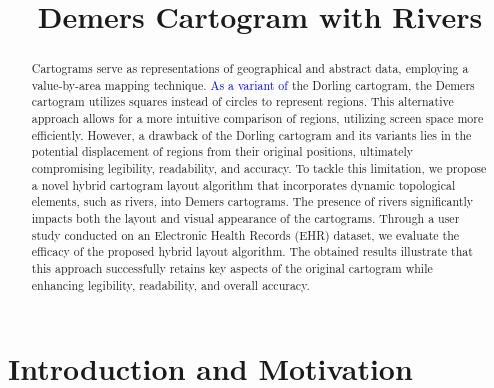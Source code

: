\documentclass[Afour,sagev,times]{sagej}
\newcommand{\new}[1]{\textcolor{blue}{#1}}
\begin{document}
\title{Demers Cartogram with Rivers}

\begin{abstract}
    Cartograms serve as representations of geographical and abstract data, employing a value-by-area mapping technique. \new{As a variant of} the Dorling cartogram, the Demers cartogram utilizes squares instead of circles to represent regions. This alternative approach allows for a more intuitive comparison of regions, utilizing screen space more efficiently. However, a drawback of the Dorling cartogram and its variants lies in the potential displacement of regions from their original positions, ultimately compromising legibility, readability, and accuracy. To tackle this limitation, we propose a novel hybrid cartogram layout algorithm that incorporates dynamic topological elements, such as rivers, into Demers cartograms. The presence of rivers significantly impacts both the layout and visual appearance of the cartograms. Through a user study conducted on an Electronic Health Records (EHR) dataset, we evaluate the efficacy of the proposed hybrid layout algorithm. The obtained results illustrate that this approach successfully retains key aspects of the original cartogram while enhancing legibility, readability, and overall accuracy.
\end{abstract}


\maketitle

\section{Introduction and Motivation}
\end{document}
